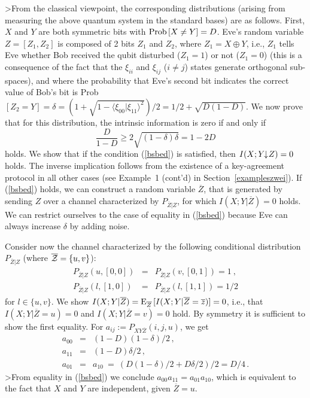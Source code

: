 \documentclass{article}
\newcommand{\oz}{\overline{z}}
\newcommand{\prob}{{\rm Prob\,}}
\newcommand{\cd}{{D}}
\newcommand{\de}{\delta}
\newcommand{\OZ}{\overline{Z}}
\newcommand{\ida}{I(X;Y\hspace{-1.3mm}\downarrow\hspace{-0.8mm} Z)}
\begin{document}
>From the classical viewpoint, the corresponding distributions (arising
 from measuring the above quantum system in the standard bases) 
are as follows. 
First, $X$ and $Y$ are both symmetric bits with $\prob[X\ne Y]=\cd$. 
Eve's random variable $Z=[Z_1,Z_2]$ is composed of 2 bits $Z_1$ and $Z_2$,
where $Z_1=X\oplus Y$, i.e., $Z_1$ tells Eve whether Bob received the qubit
disturbed ($Z_1=1$) 
or not ($Z_1=0$) (this is a consequence of the fact that the $\xi_{ii}$ and
$\xi_{ij}$ ($i\ne j$) states
 generate orthogonal sub-spaces), and where
the probability that Eve's second bit indicates the correct value
of Bob's bit 
is
Prob$[Z_2=Y]=\delta=(1+\sqrt{1-\langle \xi_{00}|\xi_{11}\rangle^2})/2=1/2+\sqrt{D(1-D)}$. 
We now prove that for this distribution, 
the intrinsic information is zero 
if and only if 
\begin{equation}\label{bsbed}
\frac{\cd}{1-\cd}\geq 2\sqrt{(1-\de)\de}=1-2D
\end{equation}
holds. 
We show that if the condition (\ref{bsbed})
 is 
satisfied, then $\ida=0$ holds. 
The inverse implication follows from the existence of a key-agreement 
protocol in all other cases (see Example~1 (cont'd) in Section~\ref{exampleszwei}).
If  (\ref{bsbed})  holds, we can construct a random variable $\OZ$,
that is generated by sending $Z$ over a channel characterized by
$P_{\OZ|Z}$,  for which  $I(X;Y|\OZ)=0$ holds. 
We can restrict ourselves to the case of equality  in (\ref{bsbed})
because Eve can always increase $\de$ by adding noise. 

Consider now the channel characterized by the following conditional 
distribution
$P_{\OZ|Z}$ (where $\overline{{\cal Z}}=\{u,v\}$):
\begin{eqnarray*}
P_{\OZ|Z}(u,[0,0])&  =&  P_{\OZ|Z}(v,[0,1]) = 1\ ,\\
 P_{\OZ|Z}(l,[1,0]) &   = &   P_{\OZ|Z}(l,[1,1])  =  1/2
\end{eqnarray*}
for $l\in\{u,v\}$.
We show $I(X;Y|\OZ)={\rm E}_{\OZ}\, [I(X;Y|\OZ=\oz)]=0$, i.e., that 
$I(X;Y|\OZ=u)=0$ and $I(X;Y|\OZ=v)=0$ hold. By symmetry it is sufficient 
to show the first equality. For  $a_{ij}:=P_{XY\OZ}(i,j,u)$, we get
\begin{eqnarray*}
a_{00} &   = & (1-D)(1-\de)/2\, ,\\
a_{11}&  = & (1-D)\de/2\, ,\\ 
a_{01}&  = &  a_{10}\ =\ 
(D(1-\de)/2+D\de/2)/2=D/4\, .
\end{eqnarray*}
>From  equality  in (\ref{bsbed})  we conclude 
$
a_{00}a_{11}=a_{01}a_{10}
$,
which is equivalent to the fact that $X$ and $Y$ are independent, given
$\OZ=u$.
\end{document}

